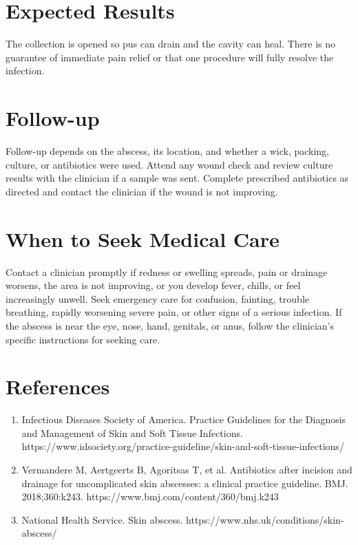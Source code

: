 \section*{Expected Results}
The collection is opened so pus can drain and the cavity can heal. There is no guarantee of immediate pain relief or that one procedure will fully resolve the infection.

\section*{Follow-up}
Follow-up depends on the abscess, its location, and whether a wick, packing, culture, or antibiotics were used. Attend any wound check and review culture results with the clinician if a sample was sent. Complete prescribed antibiotics as directed and contact the clinician if the wound is not improving.

\section*{When to Seek Medical Care}
Contact a clinician promptly if redness or swelling spreads, pain or drainage worsens, the area is not improving, or you develop fever, chills, or feel increasingly unwell. Seek emergency care for confusion, fainting, trouble breathing, rapidly worsening severe pain, or other signs of a serious infection. If the abscess is near the eye, nose, hand, genitals, or anus, follow the clinician's specific instructions for seeking care.

\section*{References}
\begin{enumerate}
  \item Infectious Diseases Society of America. Practice Guidelines for the Diagnosis and Management of Skin and Soft Tissue Infections. https://www.idsociety.org/practice-guideline/skin-and-soft-tissue-infections/
  \item Vermandere M, Aertgeerts B, Agoritsas T, et al. Antibiotics after incision and drainage for uncomplicated skin abscesses: a clinical practice guideline. BMJ. 2018;360:k243. https://www.bmj.com/content/360/bmj.k243
  \item National Health Service. Skin abscess. https://www.nhs.uk/conditions/skin-abscess/
\end{enumerate}

\clearpage
